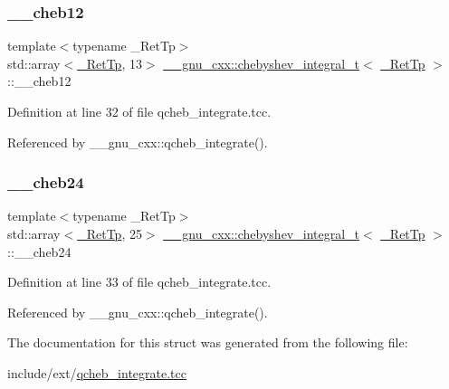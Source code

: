 \subsubsection{\texorpdfstring{\+\_\+\+\_\+cheb12}{\_\_cheb12}}
{\footnotesize\ttfamily template$<$typename \+\_\+\+Ret\+Tp$>$ \\
std\+::array$<$\hyperlink{namespace____gnu__cxx_a886e03ece3d53ff7fa6c098a40f93fa5}{\+\_\+\+Ret\+Tp}, 13$>$ \hyperlink{struct____gnu__cxx_1_1chebyshev__integral__t}{\+\_\+\+\_\+gnu\+\_\+cxx\+::chebyshev\+\_\+integral\+\_\+t}$<$ \hyperlink{namespace____gnu__cxx_a886e03ece3d53ff7fa6c098a40f93fa5}{\+\_\+\+Ret\+Tp} $>$\+::\+\_\+\+\_\+cheb12}



Definition at line 32 of file qcheb\+\_\+integrate.\+tcc.



Referenced by \+\_\+\+\_\+gnu\+\_\+cxx\+::qcheb\+\_\+integrate().

\mbox{\label{struct____gnu__cxx_1_1chebyshev__integral__t_ad1f7bac86ebf50a99544f265e7b43366}} 
\subsubsection{\texorpdfstring{\+\_\+\+\_\+cheb24}{\_\_cheb24}}
{\footnotesize\ttfamily template$<$typename \+\_\+\+Ret\+Tp$>$ \\
std\+::array$<$\hyperlink{namespace____gnu__cxx_a886e03ece3d53ff7fa6c098a40f93fa5}{\+\_\+\+Ret\+Tp}, 25$>$ \hyperlink{struct____gnu__cxx_1_1chebyshev__integral__t}{\+\_\+\+\_\+gnu\+\_\+cxx\+::chebyshev\+\_\+integral\+\_\+t}$<$ \hyperlink{namespace____gnu__cxx_a886e03ece3d53ff7fa6c098a40f93fa5}{\+\_\+\+Ret\+Tp} $>$\+::\+\_\+\+\_\+cheb24}



Definition at line 33 of file qcheb\+\_\+integrate.\+tcc.



Referenced by \+\_\+\+\_\+gnu\+\_\+cxx\+::qcheb\+\_\+integrate().



The documentation for this struct was generated from the following file\+:\begin{DoxyCompactItemize}
\item 
include/ext/\hyperlink{qcheb__integrate_8tcc}{qcheb\+\_\+integrate.\+tcc}\end{DoxyCompactItemize}
